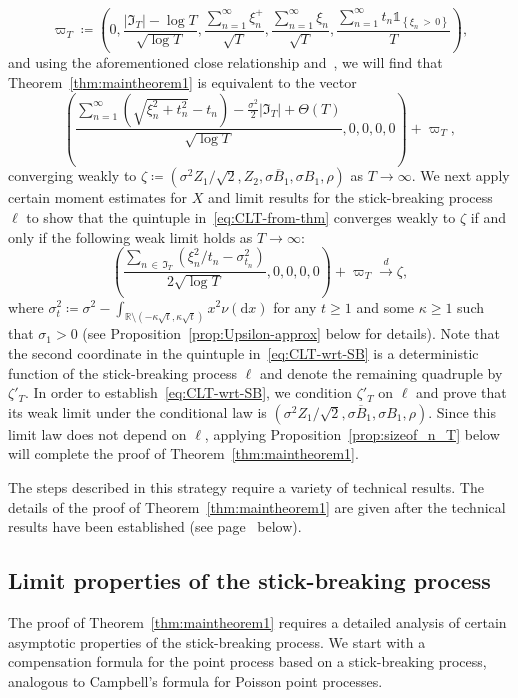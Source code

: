 \documentclass[10pt]{amsart}
\theoremstyle{definition}\newtheorem{defi}[theo]{Definition}\newtheorem{rema}[theo]{Remark}\newtheorem{exam}[theo]{Example}\newtheorem{exem}[theo]{Example}\newtheorem{nota}[theo]{Notation}
\newcommand\R{\mathbb{R}}
\newcommand\1{\mathds{1}}
\newcommand\D{\mathrm{d}}
\newcommand\GI{\mathfrak{I}}
\newcommand\cid{\xrightarrow{d}}
\newcommand\ov[1]{\overline{#1}}
\begin{document}
\[
\varpi_T\coloneqq
\left(0,\frac{|\GI_T|-\log T}{\sqrt{\log T}},\frac{\sum\limits_{n=1}^\infty\xi_n^+}{\sqrt{T}},
\frac{\sum\limits_{n=1}^\infty\xi_n}{\sqrt{T}},
\frac{\sum\limits_{n=1}^\infty t_n\1_{\left\{\xi_n\,>\,0\right\}}}{T}\right),
\]
and using the aforementioned close relationship and~\cite[Theorem~11]{CM_Fluctuation_Levy}, we will find that Theorem~\ref{thm:maintheorem1} is equivalent to the vector
\begin{equation}\label{eq:CLT-from-thm}
\left(
\frac{\sum\limits_{n=1}^\infty\left(\sqrt{\xi_n^2+t_n^2}-t_n\right) -\frac{\sigma^2}{2}|\GI_T| +\Theta(T)}{\sqrt{\log T}},0,0,0,0
\right)+\varpi_T,
\end{equation}
converging weakly to $\zeta\coloneqq(\sigma^2 Z_1/\sqrt{2}, Z_2, \sigma\ov B_1, \sigma B_1, \rho)$ as $T\to\infty$. We next apply certain moment estimates for $X$ and limit results for the stick-breaking process~$\ell$ to show that the quintuple in~\eqref{eq:CLT-from-thm} converges weakly to $\zeta$ if and only if the following weak limit holds as $T\to\infty$:
\begin{equation}\label{eq:CLT-wrt-SB}
\left(
\frac{\sum\limits_{n\,\in\,\GI_T}\left(\xi_n^2/t_n-\sigma_{t_n}^2\right)} {2\sqrt{\log T}}, 0,0,0,0
\right)+\varpi_T\cid \zeta,
\end{equation}
where $\sigma_t^2\coloneqq\sigma^2 -\int_{\R\setminus(-\kappa\sqrt{t},\kappa\sqrt{t})} x^2\nu(\D x)$ for any $t\ge 1$ and some $\kappa\ge 1$ such that $\sigma_1>0$ (see Proposition~\ref{prop:Upsilon-approx} below for details). Note that the second coordinate in the quintuple in~\eqref{eq:CLT-wrt-SB} is a deterministic function of the stick-breaking process $\ell$ and denote the remaining quadruple by $\zeta'_T$. In order to establish~\eqref{eq:CLT-wrt-SB}, we condition $\zeta'_T$ on $\ell$ and prove that its weak limit under the conditional law is $(\sigma^2Z_1/\sqrt{2}, \sigma\ov B_1, \sigma B_1,\rho)$. Since this limit law does not depend on $\ell$, applying Proposition~\ref{prop:sizeof_n_T} below will complete the proof of Theorem~\ref{thm:maintheorem1}.

The steps described in this strategy require a variety of technical results. The details of the proof of Theorem~\ref{thm:maintheorem1} are given after the technical results have been established (see page~\pageref{proof:maintheorem1} below).

\subsection{Limit properties of the stick-breaking process}\label{subsec:SB}
The proof of Theorem~\ref{thm:maintheorem1} requires a detailed analysis of certain asymptotic properties of the stick-breaking process. We start with a compensation formula for the point process based on a stick-breaking process, analogous to Campbell's formula for Poisson point processes.
\end{document}
